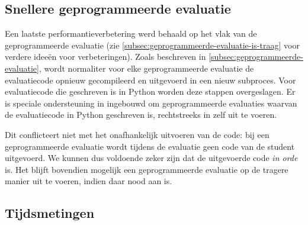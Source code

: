 \subsection{Snellere geprogrammeerde evaluatie}\label{subsec:snellere-geprogrammeerde-evaluatie}

Een laatste performantieverbetering werd behaald op het vlak van de geprogrammeerde evaluatie (zie \cref{subsec:geprogrammeerde-evaluatie-is-traag} voor verdere ideeën voor verbeteringen).
Zoals beschreven in \cref{subsec:geprogrammeerde-evaluatie}, wordt normaliter voor elke geprogrammeerde evaluatie de evaluatiecode opnieuw gecompileerd en uitgevoerd in een nieuw subproces.
Voor evaluatiecode die geschreven is in Python worden deze stappen overgeslagen.
Er is speciale ondersteuning in \tested{} ingebouwd om geprogrammeerde evaluaties waarvan de evaluatiecode in Python geschreven is, rechtstreeks in \tested{} zelf uit te voeren.

Dit conflicteert niet met het onafhankelijk uitvoeren van de code: bij een geprogrammeerde evaluatie wordt tijdens de evaluatie geen code van de student uitgevoerd.
We kunnen dus voldoende zeker zijn dat de uitgevoerde code \emph{in orde} is.
Het blijft bovendien mogelijk een geprogrammeerde evaluatie op de tragere manier uit te voeren, indien daar nood aan is.

\subsection{Tijdsmetingen}\label{subsec:tijdsmetingen}


